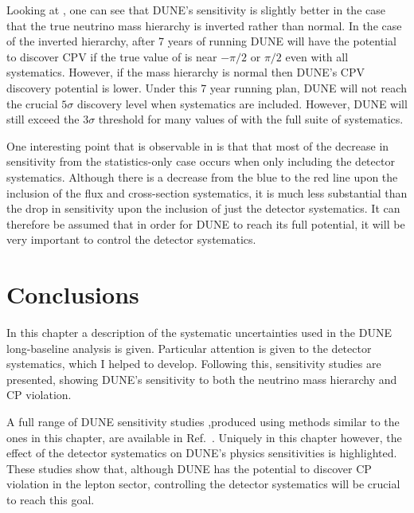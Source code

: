 Looking at , one can see that DUNE's sensitivity is slightly better in the case that the true neutrino mass hierarchy is inverted rather than normal.
In the case of the inverted hierarchy, after 7 years of running DUNE will have the potential to discover CPV if the true value of \dcp is near $-\pi/2$ or $\pi/2$ even with all systematics.
However, if the mass hierarchy is normal then DUNE's CPV discovery potential is lower. 
Under this 7 year running plan, DUNE will not reach the crucial $5\sigma$ discovery level when systematics are included. 
However, DUNE will still exceed the $3\sigma$ threshold for many values of \dcp with the full suite of systematics.

One interesting point that is observable in  is that that most of the decrease in sensitivity from the statistics-only case occurs when only including the detector systematics.
Although there is a decrease from the blue to the red line upon the inclusion of the flux and cross-section systematics, it is much less substantial than the drop in sensitivity upon the inclusion of just the detector systematics.
It can therefore be assumed that in order for DUNE to reach its full potential, it will be very important to control the detector systematics.

\section{Conclusions}
\label{sec:dune_lbl:conclusion}

In this chapter a description of the systematic uncertainties used in the DUNE long-baseline analysis is given. 
Particular attention is given to the detector systematics, which I helped to develop.
Following this, sensitivity studies are presented, showing DUNE's sensitivity to both the neutrino mass hierarchy and CP violation.

A full range of DUNE sensitivity studies ,produced using methods similar to the ones in this chapter, are available in Ref.~\cite{Abi:2020qib}.
Uniquely in this chapter however, the effect of the detector systematics on DUNE's physics sensitivities is highlighted.
These studies show that, although DUNE has the potential to discover CP violation in the lepton sector, controlling the detector systematics will be crucial to reach this goal.
